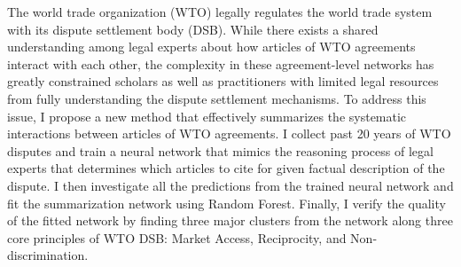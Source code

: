 The world trade organization (WTO) legally regulates the world trade system with its dispute settlement body (DSB).
While there exists a shared understanding among legal experts about how articles of WTO agreements interact with each other,
the complexity in these agreement-level networks has greatly constrained scholars as well as practitioners with limited legal resources from fully understanding the dispute settlement mechanisms. 
To address this issue, I propose a new method that effectively summarizes the systematic interactions between articles of WTO agreements.
I collect past 20 years of WTO disputes and train a neural network that mimics the reasoning process of legal experts that determines which articles to cite for given factual description of the dispute.
I then investigate all the predictions from the trained neural network and fit the summarization network using Random Forest.
Finally, I verify the quality of the fitted network %
by finding three major clusters from the network along three core principles of WTO DSB: Market Access, Reciprocity, and Non-discrimination.


